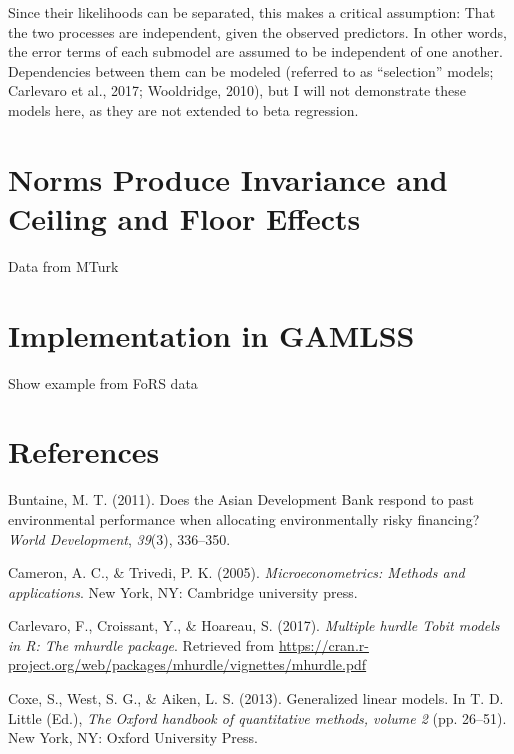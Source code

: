 \documentclass[english,man]{apa6}
\theoremstyle{definition}
\theoremstyle{definition}
\theoremstyle{remark}
\begin{document}
Since their likelihoods can be separated, this makes a critical
assumption: That the two processes are independent, given the observed
predictors. In other words, the error terms of each submodel are assumed
to be independent of one another. Dependencies between them can be
modeled (referred to as ``selection'' models; Carlevaro et al., 2017;
Wooldridge, 2010), but I will not demonstrate these models here, as they
are not extended to beta regression.

\section{Norms Produce Invariance and Ceiling and Floor
Effects}\label{norms-produce-invariance-and-ceiling-and-floor-effects}

Data from MTurk

\section{Implementation in GAMLSS}\label{implementation-in-gamlss}

Show example from FoRS data

\newpage

\section{References}\label{references}

\setlength{\parindent}{-0.5in} \setlength{\leftskip}{0.5in}

\hypertarget{refs}{}
\hypertarget{ref-buntaine2011does}{}
Buntaine, M. T. (2011). Does the Asian Development Bank respond to past
environmental performance when allocating environmentally risky
financing? \emph{World Development}, \emph{39}(3), 336--350.

\hypertarget{ref-cameron2005microeconometrics}{}
Cameron, A. C., \& Trivedi, P. K. (2005). \emph{Microeconometrics:
Methods and applications}. New York, NY: Cambridge university press.

\hypertarget{ref-carlevaro2016multiple}{}
Carlevaro, F., Croissant, Y., \& Hoareau, S. (2017). \emph{Multiple
hurdle Tobit models in R: The mhurdle package}. Retrieved from
\url{https://cran.r-project.org/web/packages/mhurdle/vignettes/mhurdle.pdf}

\hypertarget{ref-coxe2013generalized}{}
Coxe, S., West, S. G., \& Aiken, L. S. (2013). Generalized linear
models. In T. D. Little (Ed.), \emph{The Oxford handbook of quantitative
methods, volume 2} (pp. 26--51). New York, NY: Oxford University Press.
\end{document}
